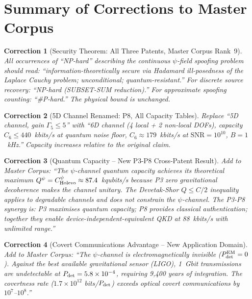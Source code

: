\documentclass[aps,prd,twocolumn,superscriptaddress,nofootinbib]{revtex4-2}
\newcommand{\SNR}{\mathrm{SNR}}
\newtheorem{correction}{Correction}
\begin{document}
\section{Summary of Corrections to Master Corpus}
\label{sec:corrections}

\begin{correction}[Security Theorem: All Three Patents, Master Corpus Rank~9]
All occurrences of ``NP-hard'' describing the \emph{continuous}
$\psi$-field spoofing problem should read: ``information-theoretically
secure via Hadamard ill-posedness of the Laplace Cauchy problem; unconditional;
quantum-resistant.'' For \emph{discrete} source recovery:
``NP-hard (SUBSET-SUM reduction).'' For approximate spoofing counting:
``\#P-hard.'' The physical bound is unchanged.
\end{correction}

\begin{correction}[5D Channel Renamed: P8, All Capacity Tables]
Replace ``5D channel, gain $\Gamma_5 \leq 5$'' with ``6D channel
(4 local + 2 non-local DOFs), capacity $C_6 \leq 440$~kbits/s at quantum
noise floor, $C_6 \approx 179$~kbits/s at $\SNR=10^{10}$, $B=1$~kHz.''
Capacity increases relative to the original claim.
\end{correction}

\begin{correction}[Quantum Capacity -- New P3-P8 Cross-Patent Result]
Add to Master Corpus: ``The $\psi$-channel quantum capacity achieves
its theoretical maximum $Q^\psi = C_{\rm Holevo}^\psi \approx 87.4$~kqubits/s
because P3 zero gravitational decoherence makes the channel unitary.
The Devetak-Shor $Q \leq C/2$ inequality applies to degradable channels
and does not constrain the $\psi$-channel. The P3-P8 synergy is:
P3 maximises quantum capacity; P8 provides classical authentication;
together they enable device-independent-equivalent QKD at 88~kbits/s
with unlimited range.''
\end{correction}

\begin{correction}[Covert Communications Advantage -- New Application Domain]
Add to Master Corpus: ``The $\psi$-channel is electromagnetically
invisible ($P_{\rm det}^{\rm EM} = 0$). Against the best available
gravitational sensor (LIGO), 1~Gbit transmissions are undetectable at
$P_{\rm det} = 5.8\times 10^{-4}$, requiring 9,400 years of integration.
The covertness rate ($1.7\times 10^{12}$ bits/$P_{\rm det}$) exceeds
optical covert communications by $10^7$--$10^8$.''
\end{correction}
\end{document}
